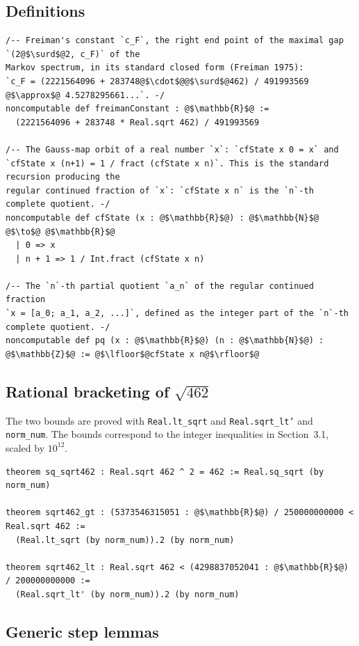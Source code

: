 \documentclass[11pt]{article}
\begin{document}
\subsection{Definitions}

\begin{lstlisting}
/-- Freiman's constant `c_F`, the right end point of the maximal gap `(2@$\surd$@2, c_F)` of the
Markov spectrum, in its standard closed form (Freiman 1975):
`c_F = (2221564096 + 283748@$\cdot$@@$\surd$@462) / 491993569 @$\approx$@ 4.5278295661...`. -/
noncomputable def freimanConstant : @$\mathbb{R}$@ :=
  (2221564096 + 283748 * Real.sqrt 462) / 491993569

/-- The Gauss-map orbit of a real number `x`: `cfState x 0 = x` and
`cfState x (n+1) = 1 / fract (cfState x n)`. This is the standard recursion producing the
regular continued fraction of `x`: `cfState x n` is the `n`-th complete quotient. -/
noncomputable def cfState (x : @$\mathbb{R}$@) : @$\mathbb{N}$@ @$\to$@ @$\mathbb{R}$@
  | 0 => x
  | n + 1 => 1 / Int.fract (cfState x n)

/-- The `n`-th partial quotient `a_n` of the regular continued fraction
`x = [a_0; a_1, a_2, ...]`, defined as the integer part of the `n`-th complete quotient. -/
noncomputable def pq (x : @$\mathbb{R}$@) (n : @$\mathbb{N}$@) : @$\mathbb{Z}$@ := @$\lfloor$@cfState x n@$\rfloor$@
\end{lstlisting}

\subsection{Rational bracketing of $\sqrt{462}$}

The two bounds are proved with \texttt{Real.lt\_sqrt} and \texttt{Real.sqrt\_lt'} and
\texttt{norm\_num}. The bounds correspond to the integer inequalities in Section~3.1, scaled by $10^{12}$.

\begin{lstlisting}
theorem sq_sqrt462 : Real.sqrt 462 ^ 2 = 462 := Real.sq_sqrt (by norm_num)

theorem sqrt462_gt : (5373546315051 : @$\mathbb{R}$@) / 250000000000 < Real.sqrt 462 :=
  (Real.lt_sqrt (by norm_num)).2 (by norm_num)

theorem sqrt462_lt : Real.sqrt 462 < (4298837052041 : @$\mathbb{R}$@) / 200000000000 :=
  (Real.sqrt_lt' (by norm_num)).2 (by norm_num)
\end{lstlisting}

\subsection{Generic step lemmas}
\end{document}
